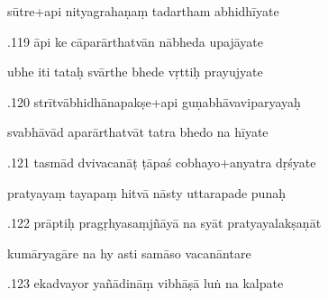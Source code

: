 \documentclass[article,12pt,a4paper]{memoir}%
\newcounter{parCount}
\begin{document}
	  
	  \pstart \leavevmode%
	sūtre+api nityagrahaṇaṃ tadartham abhidhīyate 
	{}
	\pend%
      

	  
	  \pstart {}.119 āpi ke cāparārthatvān nābheda upajāyate 
	{}
	\pend%
      

	  
	  \pstart \leavevmode%
	ubhe iti tataḥ svārthe bhede vṛttiḥ prayujyate 
	{}
	\pend%
      

	  
	  \pstart {}.120 strītvābhidhānapakṣe+api   guṇabhāvaviparyayaḥ 
	{}
	\pend%
      

	  
	  \pstart \leavevmode%
	svabhāvād aparārthatvāt tatra bhedo na hīyate 
	{}
	\pend%
      

	  
	  \pstart {}.121 tasmād dvivacanāṭ ṭāpaś cobhayo+anyatra dṛśyate 
	{}
	\pend%
      

	  
	  \pstart \leavevmode%
	pratyayaṃ tayapaṃ hitvā nāsty uttarapade punaḥ 
	{}
	\pend%
      

	  
	  \pstart {}.122 prāptiḥ pragṛhyasaṃjñāyā na syāt pratyayalakṣaṇāt 
	{}
	\pend%
      

	  
	  \pstart \leavevmode%
	kumāryagāre na hy asti samāso vacanāntare 
	{}
	\pend%
      

	  
	  \pstart {}.123 ekadvayor yañādināṃ vibhāṣā luṅ na kalpate 
	{}
	\pend%
      
\end{document}
